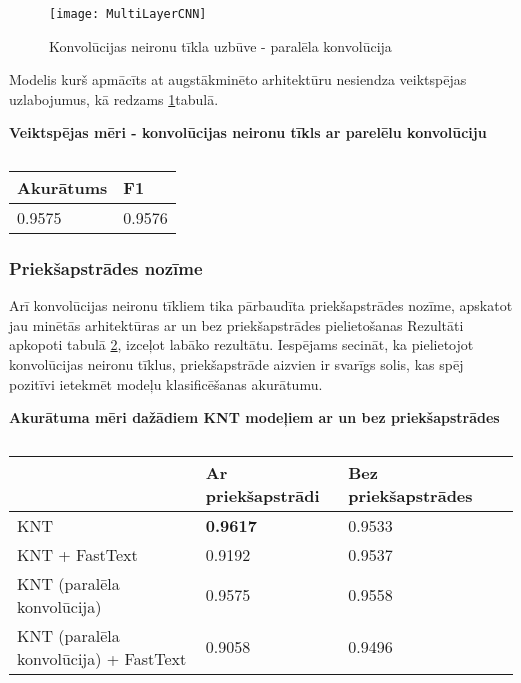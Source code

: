 \begin{figure}[H]
	\centering
	\texttt{[image: MultiLayerCNN]}
	\caption{Konvolūcijas neironu tīkla uzbūve - paralēla konvolūcija}
	\label{fig:MultiLayerCNN}
\end{figure}

\pagebreak
Modelis kurš apmācīts at augstākminēto arhitektūru nesiendza veiktspējas uzlabojumus, kā redzams \ref{tab:score_cnn_multi}tabulā.

\begin{table}[H]
\centering
\caption{\label{tab:score_cnn_multi}}
\textbf{Veiktspējas mēri -  konvolūcijas neironu tīkls ar parelēlu konvolūciju\\}
\begin{tabular}{|l|l|}
\hline
Akurātums & F1 \\ \hline
0.9575 & 0.9576  \\ \hline
\end{tabular}
\end{table}

\subsubsection{Priekšapstrādes nozīme}

Arī konvolūcijas neironu tīkliem tika pārbaudīta priekšapstrādes nozīme, apskatot jau minētās arhitektūras ar un bez priekšapstrādes pielietošanas Rezultāti apkopoti tabulā \ref{tab:accuracy_all_knt}, izceļot labāko rezultātu. Iespējams secināt, ka pielietojot konvolūcijas neironu tīklus, priekšapstrāde aizvien ir svarīgs solis, kas spēj pozitīvi ietekmēt modeļu klasificēšanas akurātumu.

\begin{table}[H]
\centering
\caption{\label{tab:accuracy_all_knt}}
\textbf{Akurātuma mēri dažādiem KNT modeļiem ar un bez priekšapstrādes\\}
\begin{tabular}{|l|l|l|l|}
\hline
                                      & Ar priekšapstrādi & Bez priekšapstrādes \\ \hline
KNT                                   &  \textbf{0.9617}            & 0.9533              \\ \hline
KNT + FastText                        & 0.9192            & 0.9537              \\ \hline
KNT (paralēla konvolūcija)            & 0.9575            & 0.9558               \\ \hline
KNT (paralēla konvolūcija) + FastText & 0.9058            & 0.9496 \\ \hline             
\end{tabular}
\end{table}

